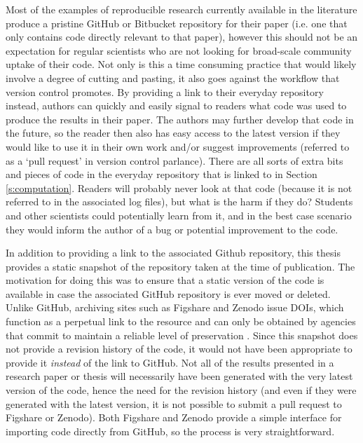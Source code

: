 Most of the examples of reproducible research currently available in the literature produce a pristine GitHub or Bitbucket repository for their paper (i.e. one that only contains code directly relevant to that paper), however this should not be an expectation for regular scientists who are not looking for broad-scale community uptake of their code. Not only is this a time consuming practice that would likely involve a degree of cutting and pasting, it also goes against the workflow that version control promotes. By providing a link to their everyday repository instead, authors can quickly and easily signal to readers what code was used to produce the results in their paper. The authors may further develop that code in the future, so the reader then also has easy access to the latest version if they would like to use it in their own work and/or suggest improvements (referred to as a `pull request' in version control parlance). There are all sorts of extra bits and pieces of code in the everyday repository that is linked to in Section \ref{s:computation}. Readers will probably never look at that code (because it is not referred to in the associated log files), but what is the harm if they do? Students and other scientists could potentially learn from it, and in the best case scenario they would inform the author of a bug or potential improvement to the code.        

In addition to providing a link to the associated Github repository, this thesis provides \citep[on Figshare;][]{IrvingFigshare2016} a static snapshot of the repository taken at the time of publication. The motivation for doing this was to ensure that a static version of the code is available in case the associated GitHub repository is ever moved or deleted. Unlike GitHub, archiving sites such as Figshare and Zenodo issue DOIs, which function as a perpetual link to the resource and can only be obtained by agencies that commit to maintain a reliable level of preservation \citep{Potter2015}. Since this snapshot does not provide a revision history of the code, it would not have been appropriate to provide it \textit{instead} of the link to GitHub. Not all of the results presented in a research paper or thesis will necessarily have been generated with the very latest version of the code, hence the need for the revision history (and even if they were generated with the latest version, it is not possible to submit a pull request to Figshare or Zenodo). Both Figshare and Zenodo provide a simple interface for importing code directly from GitHub, so the process is very straightforward.

